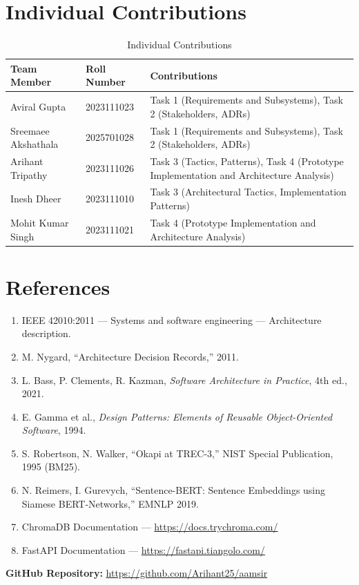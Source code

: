 \documentclass[11pt,a4paper]{article}
\begin{document}
\section{Individual Contributions}

\begin{table}[H]
\centering
\small
\begin{tabularx}{\textwidth}{llX}
\toprule
\textbf{Team Member} & \textbf{Roll Number} & \textbf{Contributions} \\
\midrule
Aviral Gupta & 2023111023 & Task 1 (Requirements and Subsystems), Task 2 (Stakeholders, ADRs) \\
Sreemaee Akshathala & 2025701028 & Task 1 (Requirements and Subsystems), Task 2 (Stakeholders, ADRs) \\
Arihant Tripathy & 2023111026 & Task 3 (Tactics, Patterns), Task 4 (Prototype Implementation and Architecture Analysis) \\
Inesh Dheer & 2023111010 & Task 3 (Architectural Tactics, Implementation Patterns) \\
Mohit Kumar Singh & 2023111021 & Task 4 (Prototype Implementation and Architecture Analysis) \\
\bottomrule
\end{tabularx}
\caption{Individual Contributions}
\end{table}


\section{References}

\begin{enumerate}
    \item IEEE 42010:2011 --- Systems and software engineering --- Architecture description.
    \item M. Nygard, ``Architecture Decision Records,'' 2011.
    \item L. Bass, P. Clements, R. Kazman, \emph{Software Architecture in Practice}, 4th ed., 2021.
    \item E. Gamma et al., \emph{Design Patterns: Elements of Reusable Object-Oriented Software}, 1994.
    \item S. Robertson, N. Walker, ``Okapi at TREC-3,'' NIST Special Publication, 1995 (BM25).
    \item N. Reimers, I. Gurevych, ``Sentence-BERT: Sentence Embeddings using Siamese BERT-Networks,'' EMNLP 2019.
    \item ChromaDB Documentation --- \url{https://docs.trychroma.com/}
    \item FastAPI Documentation --- \url{https://fastapi.tiangolo.com/}
\end{enumerate}

\vspace{1cm}
\noindent\textbf{GitHub Repository:} \url{https://github.com/Arihant25/aamsir}
\end{document}
